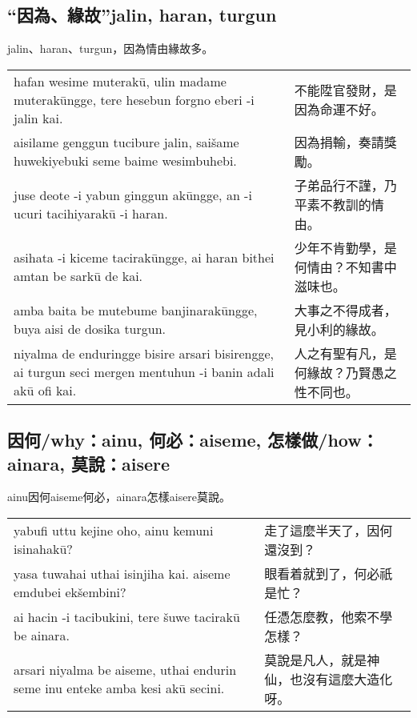 \documentclass{article}
\begin{document}
\subsection{“因為、緣故”jalin, haran, turgun}
\noindent jalin、haran、turgun，因為情由緣故多。
\begin{center}
    \begin{tabularx}{\textwidth}{XX}
        hafan wesime muterak\={u}, ulin madame muterak\={u}ngge, tere hesebun forgno eberi -i jalin kai. & 不能陞官發財，是因為命運不好。\\
        aisilame genggun tucibure jalin, sai\v{s}ame huwekiyebuki seme baime wesimbuhebi. & 因為捐輸，奏請獎勵。\\
        juse deote -i yabun ginggun ak\={u}ngge, an -i ucuri tacihiyarak\={u} -i haran. & 子弟品行不謹，乃平素不教訓的情由。\\
        asihata -i kiceme tacirak\={u}ngge, ai haran bithei amtan be sark\={u} de kai. & 少年不肯勤學，是何情由？不知書中滋味也。\\
        amba baita be mutebume banjinarak\={u}ngge, buya aisi de dosika turgun. & 大事之不得成者，見小利的緣故。\\
        niyalma de enduringge bisire arsari bisirengge, ai turgun seci mergen mentuhun -i banin adali ak\={u} ofi kai. & 人之有聖有凡，是何緣故？乃賢愚之性不同也。
    \end{tabularx}
\end{center}

\subsection{因何/why：ainu, 何必：aiseme, 怎樣做/how：ainara, 莫說：aisere}
\noindent ainu因何aiseme何必，ainara怎樣aisere莫說。
\begin{center}
    \begin{tabularx}{\textwidth}{XX}
        yabufi uttu kejine oho, ainu kemuni isinahak\={u}? & 走了這麼半天了，因何還沒到？\\
        yasa tuwahai uthai isinjiha kai. aiseme emdubei ek\v{s}embini? & 眼看着就到了，何必祇是忙？\\
        ai hacin -i tacibukini, tere \v{s}uwe tacirak\={u} be ainara. & 任憑怎麼教，他索不學怎樣？\\
        arsari niyalma be aiseme, uthai endurin seme inu enteke amba kesi ak\={u} secini. & 莫說是凡人，就是神仙，也沒有這麼大造化呀。
    \end{tabularx}
\end{center}
\end{document}
